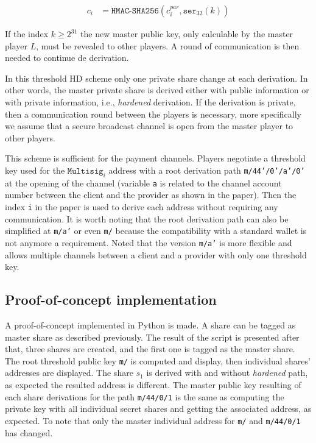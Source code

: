 \begin{equation}
\begin{split}
  c_i &= \texttt{HMAC-SHA256}(c_i^{par}, \texttt{ser}_{32}(k))
\end{split}
\end{equation}

If the index $k \geq 2^{31}$ the new master public key, only calculable by the
master player $L$, must be revealed to other players. A round of communication
is then needed to continue de derivation.

In this threshold HD scheme only one private share change at each derivation. In
other words, the master private share is derived either with public information
or with private information, i.e., \textit{hardened} derivation. If the
derivation is private, then a communication round between the players is
necessary, more specifically we assume that a secure broadcast channel is open
from the master player to other players.

This scheme is sufficient for the payment channels. Players negotiate a
threshold key used for the $\texttt{Multisig}_i$ address with a root derivation
path \texttt{m/44'/0'/a'/0'} at the opening of the channel (variable \texttt{a}
is related to the channel account number between the client and the provider as
shown in the paper). Then the index \texttt{i} in the paper is used to derive
each address without requiring any communication. It is worth noting that the
root derivation path can also be simplified at \texttt{m/a'} or even \texttt{m/}
because the compatibility with a standard wallet is not anymore a requirement.
Noted that the version \texttt{m/a'} is more flexible and allows multiple
channels between a client and a provider with only one threshold key.

\subsection{Proof-of-concept implementation}

A proof-of-concept implemented in Python is made. A share can be tagged as
master share as described previously. The result of the script is presented
after that, three shares are created, and the first one is tagged as the master
share. The root threshold public key \texttt{m/} is computed and display, then
individual shares' addresses are displayed. The share $s_1$ is derived with and
without \textit{hardened} path, as expected the resulted address is different.
The master public key resulting of each share derivations for the path
\texttt{m/44/0/1} is the same as computing the private key with all individual
secret shares and getting the associated address, as expected. To note that only
the master individual address for \texttt{m/} and \texttt{m/44/0/1} has changed.

